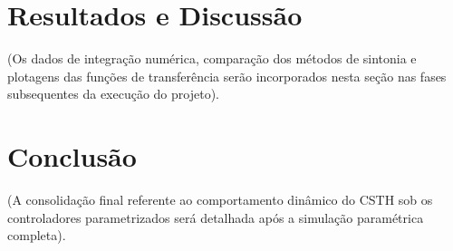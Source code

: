 \documentclass[12pt, a4paper]{article}
\begin{document}
\section{Resultados e Discussão}

(Os dados de integração numérica, comparação dos métodos de sintonia e plotagens das funções de transferência serão incorporados nesta seção nas fases subsequentes da execução do projeto).

\section{Conclusão}

(A consolidação final referente ao comportamento dinâmico do CSTH sob os controladores parametrizados será detalhada após a simulação paramétrica completa).

\newpage

 
\end{document}

